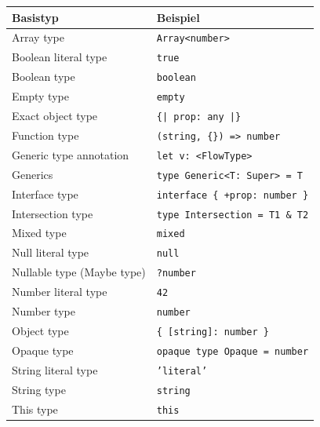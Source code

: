 \begin{table}[tbp]
  \footnotesize
  \begin{tabularx}{\textwidth}{@{}ll@{}}
    \midrule
    \textbf{Basistyp}         & \textbf{Beispiel}                        \\
    \midrule
    Array type                 & \texttt{Array<{}number>{}}               \\
    Boolean literal type       & \texttt{true}                            \\
    Boolean type               & \texttt{boolean}                         \\
    Empty type                 & \texttt{empty}                           \\
    Exact object type          & \texttt{\{| prop: any |\}}               \\
    Function type              & \texttt{(string, \{\}) => number}        \\
    Generic type annotation    & \texttt{let v: <{}FlowType>{}}           \\
    Generics                   & \texttt{type Generic<{}T: Super> = T}    \\
    Interface type             & \texttt{interface \{ +prop: number \}}   \\
    Intersection type          & \texttt{type Intersection = T1 \& T2}    \\
    Mixed type                 & \texttt{mixed}                           \\
    Null literal type          & \texttt{null}                            \\
    Nullable type (Maybe type) & \texttt{?number}                         \\
    Number literal type        & \texttt{42}                              \\
    Number type                & \texttt{number}                          \\
    Object type                & \texttt{\{ {[}string{]}: number \}}      \\
    Opaque type                & \texttt{opaque type Opaque = number}     \\
    String literal type        & \texttt{'literal'}                       \\
    String type                & \texttt{string}                          \\
    This type                  & \texttt{this}                            \\

\end{tabularx}
\end{table}
